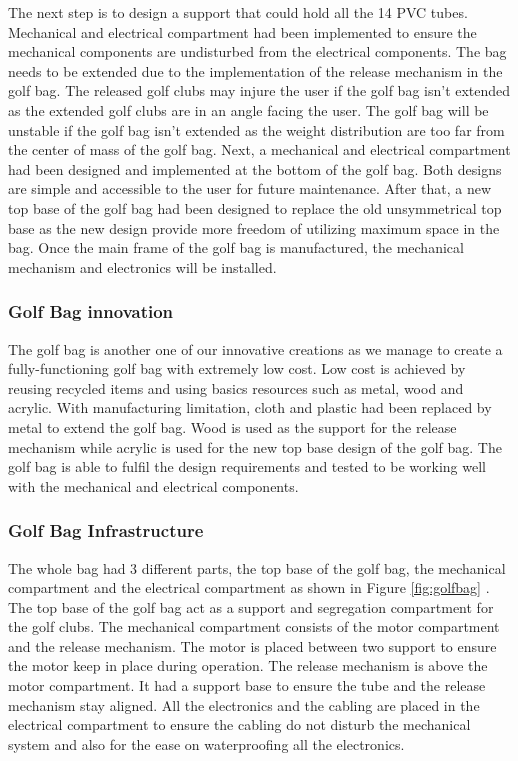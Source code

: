 \documentclass[11pt,landscape]{article}
\begin{document}
\begin{multicols}{3}
    The next step is to design a support that could hold all the 14 PVC tubes.
    Mechanical and electrical compartment had been implemented to ensure the
    mechanical components are undisturbed from the electrical components. The
    bag needs to be extended due to the implementation of the release mechanism
    in the golf bag. The released golf clubs may injure the user if the golf bag
    isn’t extended as the extended golf clubs are in an angle facing the user.
    The golf bag will be unstable if the golf bag isn’t extended as the weight
    distribution are too far from the center of mass of the golf bag. Next, a
    mechanical and electrical compartment had been designed and implemented at
    the bottom of the golf bag. Both designs are simple and accessible to the
    user for future maintenance. After that, a new top base of the golf bag had
    been designed to replace the old unsymmetrical top base as the new design
    provide more freedom of utilizing maximum space in the bag. Once the main
    frame of the golf bag is manufactured, the mechanical mechanism and
    electronics will be installed. 
    
    
    \subsubsection{Golf Bag innovation}
    The golf bag is another one of our innovative creations as we manage to
    create a fully-functioning golf bag with extremely low cost. Low cost is
    achieved by reusing recycled items and using basics resources such as metal,
    wood and acrylic. With manufacturing limitation, cloth and plastic had been
    replaced by metal to extend the golf bag. Wood is used as the support for
    the release mechanism while acrylic is used for the new top base design of
    the golf bag. The golf bag is able to fulfil the design requirements and
    tested to be working well with the mechanical and electrical components.
    
    \subsubsection{Golf Bag Infrastructure}
    The whole bag had 3 different parts, the top base of the golf bag, the
    mechanical compartment and the electrical compartment as shown in Figure
    \ref{fig:golfbag} . The top base of the golf bag act as a support and
    segregation compartment for the golf clubs. The mechanical compartment
    consists of the motor compartment and the release mechanism. The motor is
    placed between two support to ensure the motor keep in place during
    operation. The release mechanism is above the motor compartment. It had a
    support base to ensure the tube and the release mechanism stay aligned. All
    the electronics and the cabling are placed in the electrical compartment to
    ensure the cabling do not disturb the mechanical system and also for the
    ease on waterproofing all the electronics.
    

\end{multicols}
\end{document}
